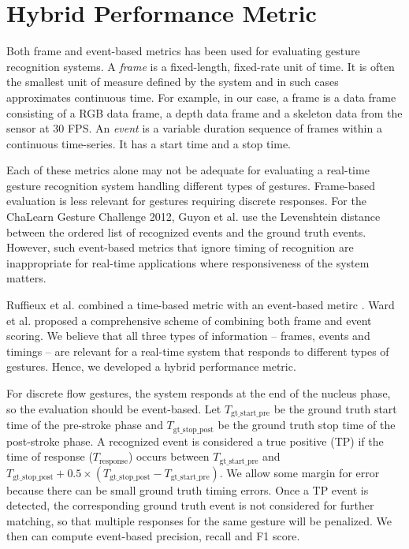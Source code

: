 \documentclass[conference]{IEEEtran}
\begin{document}
\section{Hybrid Performance Metric}
Both frame \cite{song12} and event-based \cite{guyon13} metrics has been
used for evaluating gesture recognition systems. A \textit{frame} is a
fixed-length, fixed-rate unit of time. It is often the smallest unit of measure
defined by the system \cite{ward11} and in such cases approximates continuous
time.
For example, in our case, a frame is a data frame consisting of a RGB data frame, a depth data frame and a skeleton data from the
sensor at 30 FPS. An \textit{event} is a variable duration sequence of frames
within a continuous time-series.  It has a start time and a stop time.

Each of these metrics alone may not be adequate for evaluating a real-time
gesture recognition system handling different types of gestures. Frame-based
evaluation is less relevant for gestures requiring discrete responses. For the ChaLearn Gesture Challenge 2012, Guyon et al.
\cite{guyon13} use the Levenshtein distance between the ordered list of
recognized events and the ground truth events. However, such event-based metrics
that ignore timing of recognition are inappropriate for real-time
applications where responsiveness of the system matters.

Ruffieux et al. combined a time-based metric with an event-based metirc
\cite{Ruffieux2013}. Ward et al. \cite{ward11} proposed a comprehensive
scheme of combining both frame and event scoring.
We believe that all three types of information -- frames, events and
timings -- are relevant for a real-time system that responds to different types
of gestures. Hence, we developed a hybrid performance metric.

For discrete flow gestures, the system responds at the end of the nucleus phase,
so the evaluation should be event-based. Let $T_{{\text{gt\_start\_pre}}}$ be
the ground truth start time of the pre-stroke phase and
$T_{{\text{gt\_stop\_post}}}$ be the ground truth stop time of the post-stroke
phase.
A recognized event is considered a true positive (TP) if the time of response ($T_{\text{response}}$) 
occurs between $T_{{\text{gt\_start\_pre}}}$ and $T_{{\text{gt\_stop\_post}}} +
0.5\times(T_{{\text{gt\_stop\_post}}} - T_{\text{gt\_start\_pre}})$. We allow
some margin for error because there can be small ground truth timing errors.
Once a TP event is detected, the corresponding ground truth event is not
considered for further matching, so that multiple responses for the same gesture
will be penalized. We then can compute event-based precision, recall and F1 score.
\end{document}
